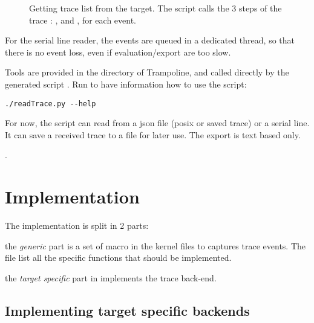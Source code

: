 \begin{figure}[htbp]
    \centering
	\begin{adjustbox}{width=.7\linewidth,keepaspectratio}
		
	\end{adjustbox}
	\caption{Getting trace list from the target. The  script calls the 3 steps of the trace : ,  and , for each event.}
	\label{fig:trace}
\end{figure}

For the serial line reader, the events are queued in a dedicated thread, so that there is no event loss, even if evaluation/export are too slow.


Tools are provided in the  directory of Trampoline, and called directly by the generated script . Run to have information how to use the script:

\begin{lstlisting}
./readTrace.py --help
\end{lstlisting}

For now, the script can read from a json file (posix or saved trace) or a serial line. It can save a received trace to a file for later use. The export is text based only.

.


\section{Implementation}
The implementation is split in 2 parts:
\begin{pitemize}
	\item the \emph{generic} part is a set of macro in the  kernel files to captures trace events. The file  list all the specific functions that should be implemented.
	\item the \emph{target specific} part in  implements the trace back-end. 
\end{pitemize}

\subsection{Implementing target specific backends}
\label{sec:trace:targetbackend}

